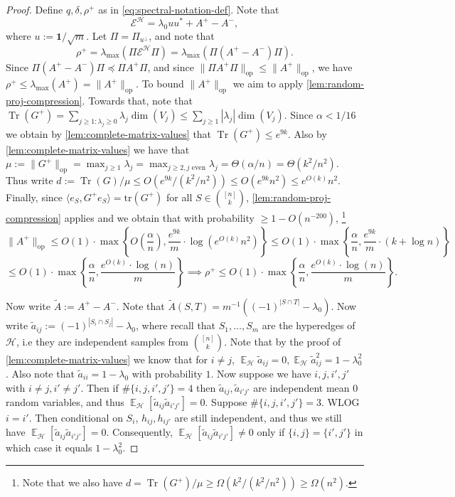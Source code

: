 \documentclass
[11pt,letterpaper]
{article}
\renewcommand{\tilde}{\widetilde}
\theoremstyle{definition}
\newcommand{\Tr}{\operatorname{Tr}}
\newcommand{\cE}{{\mathcal E}}
\newcommand{\1}{\mathbf{1}}
\newcommand{\tr}{\mathrm{tr}}
\newcommand{\cH}{\mathcal H}
\DeclareMathOperator*{\E}{\mathbb{E}}
\renewcommand{\geq}{\geqslant}
\renewcommand{\leq}{\leqslant}
\renewcommand{\preceq}{\preccurlyeq}
\begin{document}
\begin{proof}
Define $q, \delta, \rho^+$ as in \cref{eq:spectral-notation-def}. Note that 
    \[\cE^\cH = \lambda_0uu^* + A^+ - A^-,\]
    where $u:= \1/\sqrt{m}$. Let $\Pi = \Pi_{u^\perp}$, and note that 
    \[\rho^+ = \lambda_{\max}\left(\Pi\cE^\cH\Pi\right) = \lambda_{\max}\left(\Pi(A^+ - A^-)\Pi\right).\]
    Since $\Pi(A^+ - A^-)\Pi\preceq\Pi A^+\Pi$, and since $\|\Pi A^+\Pi\|_{\operatorname{op}}\leq\|A^+\|_{\operatorname{op}}$, we have $\rho^+\leq\lambda_{\max}(A^+) = \|A^+\|_{\operatorname{op}}$. To bound $\|A^+\|_{\operatorname{op}}$ we aim to apply \cref{lem:random-proj-compression}. Towards that, note that $\Tr(G^+) = \sum_{j\geq 1:\lambda_j\geq 0}\lambda_j\dim(V_j)\leq\sum_{j\geq 1}|\lambda_j|\dim(V_j)$. Since $\alpha < 1/16$ we obtain by \cref{lem:complete-matrix-values} that $\Tr(G^+)\leq e^{9k}$. Also by \cref{lem:complete-matrix-values} we have that $\mu := \|G^+\|_{\operatorname{op}} = \max_{j\geq 1}\lambda_j = \max_{j\geq 2, j\text{ even}}\lambda_j = \Theta(\alpha/n) = \Theta(k^2/n^2)$. Thus write $d:= \Tr(G)/\mu\leq O(e^{9k}/(k^2/n^2))\leq O(e^{9k}n^2)\leq e^{O(k)}n^2$. Finally, since $\langle e_S, G^+ e_S\rangle = \tr(G^+)$ for all $S\in\binom{[n]}{k}$, \cref{lem:random-proj-compression} applies and we obtain that with probability $\geq 1 - O(n^{-200})$, \footnote{Note that we also have $d = \Tr(G^+)/\mu\geq \Omega(k^2/(k^2/n^2))\geq\Omega(n^2)$.}
    \[\|A^+\|_{\operatorname{op}}\leq O(1)\cdot\max\left\{O\left(\frac{\alpha}{n}\right), \frac{e^{9k}}{m}\cdot\log\left(e^{O(k)}n^2\right)\right\}\leq O(1)\cdot\max\left\{\frac{\alpha}{n}, \frac{e^{9k}}{m}\cdot(k + \log n)\right\}\]
    \[\leq O(1)\cdot\max\left\{\frac{\alpha}{n}, \frac{e^{O(k)}\cdot\log(n)}{m}\right\}\implies\rho^+\leq O(1)\cdot\max\left\{\frac{\alpha}{n}, \frac{e^{O(k)}\cdot\log(n)}{m}\right\}.\]
    
    Now write $\tilde{A}:= A^+ - A^-$. Note that $\tilde{A}(S, T) = m^{-1}((-1)^{|S\cap T|} - \lambda_0)$. Now write $\tilde{a}_{ij}:= (-1)^{|S_i\cap S_j|} - \lambda_0$, where recall that $S_1, \ldots, S_m$ are the hyperedges of $\cH$, i.e they are independent samples from $\binom{[n]}{k}$. Note that by the proof of \cref{lem:complete-matrix-values} we know that for $i\neq j$, $\E_\cH \tilde{a}_{ij} = 0, \E_\cH \tilde{a}_{ij}^2 = 1 - \lambda_0^2$. Also note that $\tilde{a}_{ii} = 1 - \lambda_0$ with probability $1$. Now suppose we have $i, j, i', j'$ with $i\neq j, i'\neq j'$. Then if $\#\{i, j, i', j'\} = 4$ then $\tilde{a}_{ij}, \tilde{a}_{i'j'}$ are independent mean $0$ random variables, and thus $\E_{\cH}[\tilde{a}_{ij}\tilde{a}_{i'j'}] = 0$. Suppose $\#\{i, j, i', j'\} = 3$. WLOG $i = i'$. Then conditional on $S_i$, $h_{ij}, h_{ij'}$ are still independent, and thus we still have $\E_{\cH}[\tilde{a}_{ij}\tilde{a}_{i'j'}] = 0$. Consequently, $\E_{\cH}[\tilde{a}_{ij}\tilde{a}_{i'j'}] \neq 0$ only if $\{i, j\} = \{i', j'\}$ in which case it equals $1 - \lambda_0^2$.
    

\end{proof}
\end{document}
